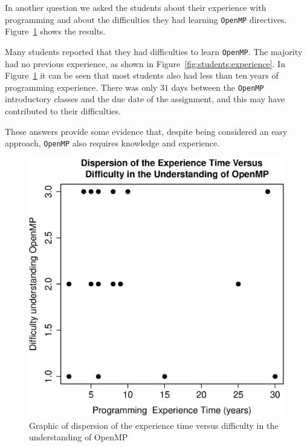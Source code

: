 In another question we asked the students about their experience with programming and about the difficulties they had learning \texttt{OpenMP} directives. Figure~\ref{fig:DifOpenMP} shows the results.

Many students reported that they had difficulties to learn \texttt{OpenMP}. The majority had no previous experience, as shown in Figure~\ref{fig:students:experience}. In Figure~\ref{fig:DifOpenMP} it can be seen that most students also had less than ten years of programming experience. There was only $31$ days between the \texttt{OpenMP} introductory classes and the due date of the assignment, and this may have contributed to their difficulties.

These answers provide some evidence that, despite being considered an easy approach, \texttt{OpenMP} also requires knowledge and experience.

\begin{figure}[ht]
\centering
\includegraphics[width=0.95\columnwidth,height=0.9\columnwidth]{figures/experience.eps}
\caption{Graphic of dispersion of the experience time versus
    difficulty in the understanding of OpenMP}
\label{fig:DifOpenMP}
\end{figure}



